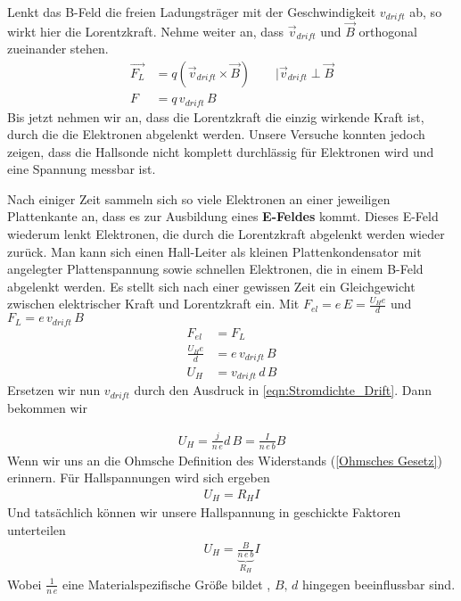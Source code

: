 Lenkt das B-Feld die freien Ladungsträger mit der Geschwindigkeit $v_{drift}$ ab, so wirkt hier die Lorentzkraft. Nehme weiter an, dass $\vec{v}_{drift}$ und $\vec{B}$ orthogonal zueinander stehen.
\begin{align} \label{eqn:HallHerleitung LKraft}
\vec{F_L} &= q \left(\vec{v}_{drift}  \times \vec{B} \right) \qquad  \bigg| \vec{v}_{drift} \perp \vec{B} \\
F 			&= q \, v_{drift} \, B
\end{align}
Bis jetzt  nehmen wir an, dass die Lorentzkraft die einzig wirkende Kraft ist, durch die die Elektronen abgelenkt werden. Unsere Versuche konnten jedoch zeigen, dass die Hallsonde nicht komplett durchlässig für Elektronen wird und eine Spannung messbar ist. \par 
Nach einiger Zeit sammeln sich so viele Elektronen an einer jeweiligen Plattenkante an, dass es zur Ausbildung eines \textbf{E-Feldes} kommt. Dieses E-Feld wiederum lenkt Elektronen, die durch die Lorentzkraft abgelenkt werden wieder zurück. Man kann sich einen Hall-Leiter als kleinen Plattenkondensator mit angelegter Plattenspannung sowie schnellen Elektronen, die in einem B-Feld abgelenkt werden.
Es stellt sich nach einer gewissen Zeit ein Gleichgewicht zwischen  elektrischer Kraft und Lorentzkraft ein.
Mit $F_{el} = e\, E = \frac{U_H e}{d}$ und $F_L = e \, v_{drift} \, B$
\begin{align*}
F_{el} &= F_{L} \\
\frac{U_H e}{d} &= e \, v_{drift} \, B\\
U_H &= v_{drift} \, d \, B
\end{align*} Ersetzen wir nun $v_{drift}$ durch den Ausdruck in \ref{eqn:Stromdichte_Drift}. Dann bekommen wir

\begin{align}
\boxed{U_H = \frac{j}{n\, e} d \, B = \frac{I}{n \, e \,b} B }
\end{align}
Wenn wir uns an die Ohmsche Definition des Widerstands (\ref{Ohmsches Gesetz}) erinnern. Für Hallspannungen wird sich ergeben
\begin{align} \label{eqn:Hall Ohm}
\boxed{U_H = R_H I}
\end{align} Und tatsächlich können wir unsere Hallspannung in geschickte Faktoren unterteilen
\begin{align} \label{eqn:HallspannungDef}
\boxed{U_H = \underbrace{\frac{B}{n \, e \,b}}_{R_H} I}
\end{align}Wobei $\frac{1}{n\, e}$ eine Materialspezifische Größe bildet , $B, \,d$ hingegen beeinflussbar sind.

